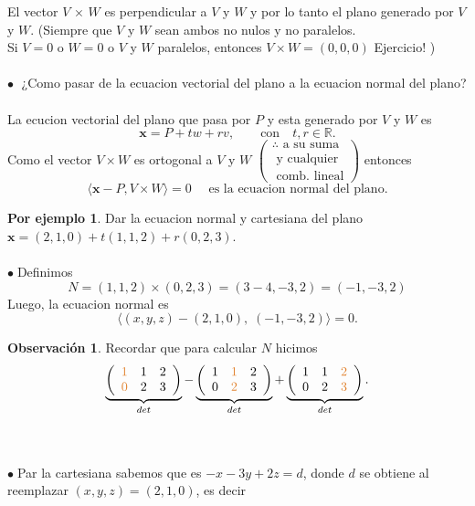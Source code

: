 \documentclass{article}
\theoremstyle{definition}
\newtheorem*{obs}{Observación}
\newtheorem*{ej}{Por ejemplo}
\theoremstyle{remark}
\newcommand\bl{$\bullet\;$}
\begin{document}
El vector $V$ $\times$ $W$ es perpendicular a $V$ y $W$ y por lo tanto el plano generado por $V$ y $W$. \big(Siempre que $V$ y $W$ sean ambos no nulos y no paralelos. \\ Si $V=0$ o $W=0$ o $V$ y $W$ paralelos, entonces $V \times W = (0,0,0)$ \quad Ejercicio! \big)
\\\\
\textcolor{rojop2}{\bl} ¿Como pasar de la ecuacion vectorial del plano a la ecuacion normal del plano? \\\\
La ecucion vectorial del plano que pasa por $P$ y esta generado por $V$ y $W$ es \[
  \mathbf{x}=P+tw+rv,\quad \quad \text{con}\quad t,r \in \mathbb{R}. 
\]
Como el vector $V \times W$ es ortogonal a $V$ y $W$ $\left(\begin{array}{l}
  \therefore \text{ a su suma } \\ 
  \text{ y cualquier } \\ 
  \text{ comb. lineal}
  \end{array}\right)$ entonces \[ 
  \langle \mathbf{x}-P, V \times W \rangle = 0 \quad \text{ es la ecuacion normal del plano.}
\]
\begin{ej}
  Dar la ecuacion normal y cartesiana del plano $\mathbf{x}=(2,1,0)+t(1,1,2)+r(0,2,3)$. \\\\ \bl Definimos $$N=(1,1,2) \times (0,2,3) = (3-4,-3,2)=(-1,-3,2)$$ Luego, la ecuacion normal es \[
\langle (x,y,z)-(2,1,0), \; (-1,-3,2)\rangle = 0.
  \]
\end{ej}
\begin{obs}
  Recordar que para calcular $N$ hicimos \[
\underbrace{\left(\begin{array}{lll}
      \textcolor{rojop2}{1} & 1 & 2 \\ 
      \textcolor{rojop2}{0} & 2 & 3 
\end{array}\right)}_{det}
  -
  \underbrace{\left(\begin{array}{lll} 
      1 & \textcolor{rojop2}{1} & 2 \\ 
      0 & \textcolor{rojop2}{2} & 3 
\end{array}\right)}_{det}
  +
  \underbrace{\left(\begin{array}{lll}
      1 & 1 & \textcolor{rojop2}{2} \\ 
      0 & 2 & \textcolor{rojop2}{3} 
  \end{array}\right)}_{det}.
  \]
\end{obs}\;
\\ \\ \bl Par la cartesiana sabemos que es $-x-3y+2z=d$, donde $d$ se obtiene al reemplazar $(x,y,z)=(2,1,0)$, es decir 
\end{document}
